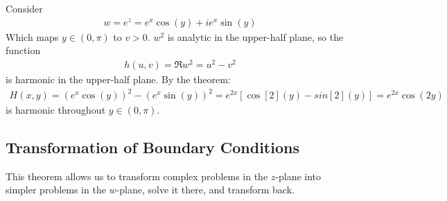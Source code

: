 \documentclass[12pt, english]{book}
\begin{document}
	\begin{example}
		Consider
		\begin{align*}
			w = e^z = e^x \cos(y) + ie^x \sin(y)
		\end{align*}
		Which maps \(y \in (0,\pi)\) to \(v>0\). \(w^2\) is analytic in the upper-half plane, so the function 
		\begin{align*}
			h(u,v) = \Re{w^2} = u^2 - v^2
		\end{align*}
		is harmonic in the upper-half plane. By the theorem:
		\begin{align*}
			H(x,y) 
			= (e^x \cos(y))^2 - (e^x \sin(y))^2 
			= e^{2x} [\cos[2](y) - sin[2](y)] 
			= e^{2x} \cos(2y)
		\end{align*}
		is harmonic throughout \(y \in (0,\pi)\).
	\end{example}
	
	\subsection{Transformation of Boundary Conditions} \label{Transformation of Boundary Conditions Subsection - Complex}
	
	
	This theorem allows us to transform complex problems in the \(z\)-plane into simpler problems in the \(w\)-plane, solve it there, and transform back.
	
\end{document}
